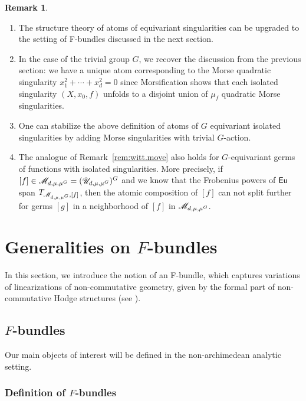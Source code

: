 \documentclass[twoside,leqno]{article}
\numberwithin{equation}{section}
\theoremstyle{plain}
\theoremstyle{definition}
\newtheorem{remark}[equation]{Remark}
\begin{document}
\begin{remark}
\begin{enumerate}[wide]
\item The structure theory of atoms of equivariant singularities  can be upgraded to the setting of F-bundles discussed in the next section.
\item In the case of the trivial group $G$, we recover the discussion from the previous section: we have a unique atom corresponding to the Morse quadratic singularity $x_{1}^2 + \cdots + x_{d}^2 = 0$ since Morsification shows that each isolated singularity $(X,x_{0},f)$ unfolds to a disjoint union of $\mu_{f}$ quadratic Morse singularities.
\item One can stabilize the above definition of atoms of $G$ equivariant isolated singularities by adding Morse singularities with trivial $G$-action.
\item The analogue of Remark~\ref{rem:witt.move} also holds for $G$-equivariant germs of functions with isolated singularities. More precisely, if $[f] \in \mathscr{M}_{d,\mu,\mu^{G}} = (\mathscr{U}_{d,\mu,\mu^{G}})^{G}$ and we know that the Frobenius powers of $\operatorname{\mathsf{Eu}}$ span $T_{\mathscr{M}_{d,\mu,\mu^{G}},[f]}$, then the atomic composition of $[f]$ can not split further for germs $[g]$ in a neighborhood of $[f]$ in $\mathscr{M}_{d,\mu,\mu^{G}}$.
\end{enumerate}
\end{remark}

\section{Generalities on \texorpdfstring{$F$}{F}-bundles} \label{sec:Fbundles}


In this section, we introduce the notion of an F-bundle, which captures variations of  linearizations of non-commutative geometry, given by the formal part of non-commutative Hodge 
structures (see \cite{Katzarkov_Hodge_theoretic_aspects}).

\subsection{\texorpdfstring{$F$}{F}-bundles} \label{sec:definition_of_F-bundles}

Our main objects of interest will be defined in the non-archimedean analytic setting.  

\subsubsection{Definition of \texorpdfstring{$F$}{F}-bundles}
\label{sssec-rigidF}
\end{document}
